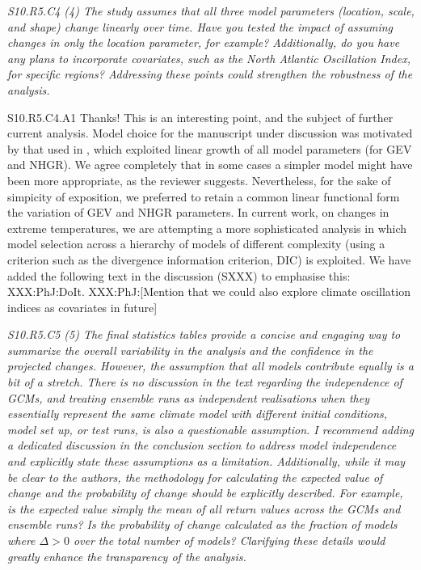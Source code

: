 \documentclass[a4paper,10pt]{article}
\begin{document}
	\emph{S10.R5.C4 (4) The study assumes that all three model parameters (location, scale, and shape) change linearly over time. Have you tested the impact of assuming changes in only the location parameter, for example? Additionally, do you have any plans to incorporate covariates, such as the North Atlantic Oscillation Index, for specific regions? Addressing these points could strengthen the robustness of the analysis.}

	S10.R5.C4.A1 Thanks! This is an interesting point, and the subject of further current analysis. Model choice for the manuscript under discussion was motivated by that used in \cite{EwnJnt23a}, which exploited linear growth of all model parameters (for GEV and NHGR). We agree completely that in some cases a simpler model might have been more appropriate, as the reviewer suggests. Nevertheless, for the sake of simpicity of exposition, we preferred to retain a common linear functional form the variation of GEV and NHGR parameters. In current work, on changes in extreme temperatures, we are attempting a more sophisticated analysis in which model selection across a hierarchy of models of different complexity (using a criterion such as the divergence information criterion, DIC) is exploited. We have added the following text in the discussion (SXXX) to emphasise this: XXX:PhJ:DoIt. XXX:PhJ:[Mention that we could also explore climate oscillation indices as covariates in future]

	\emph{S10.R5.C5 (5) The final statistics tables provide a concise and engaging way to summarize the overall variability in the analysis and the confidence in the projected changes. However, the assumption that all models contribute equally is a bit of a stretch. There is no discussion in the text regarding the independence of GCMs, and treating ensemble runs as independent realisations when they essentially represent the same climate model with different initial conditions, model set up, or test runs, is also a questionable assumption. I recommend adding a dedicated discussion in the conclusion section to address model independence and explicitly state these assumptions as a limitation. Additionally, while it may be clear to the authors, the methodology for calculating the expected value of change and the probability of change should be explicitly described. For example, is the expected value simply the mean of all return values across the GCMs and ensemble runs? Is the probability of change calculated as the fraction of models where $\Delta > 0$ over the total number of models? Clarifying these details would greatly enhance the transparency of the analysis.}
\end{document}
